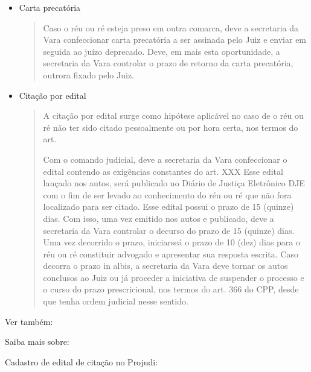 \documentclass[letterpaper,10pt,brazil]{sphinxmanual}
\begin{document}
\begin{itemize}
\begin{quote}
\begin{itemize}
\end{itemize}
\end{quote}

\item {} 
\sphinxAtStartPar
Carta precatória
\begin{quote}

\sphinxAtStartPar
Caso o réu ou ré esteja preso em outra comarca, deve a secretaria da Vara confeccionar carta precatória a ser assinada pelo Juiz e enviar em seguida ao juízo deprecado. Deve, em mais esta oportunidade, a secretaria da Vara controlar o prazo de retorno da carta precatória, outrora fixado pelo Juiz.
\end{quote}

\item {} 
\sphinxAtStartPar
Citação por edital
\begin{quote}

\sphinxAtStartPar
A citação por edital surge como hipótese aplicável no caso de o réu ou ré não ter sido citado pessoalmente ou por hora certa, nos termos do art.

\sphinxAtStartPar
Com o comando judicial, deve a secretaria da Vara confeccionar o edital contendo as exigências constantes do art. XXX
Esse edital lançado nos autos, será publicado no Diário de Justiça Eletrônico \sphinxhyphen{} DJE com o fim de ser levado ao conhecimento do réu ou ré que não fora localizado para ser citado.
Esse edital possui o prazo de 15 (quinze) dias. Com isso, uma vez emitido nos autos e publicado, deve a secretaria da Vara controlar o decurso do prazo de 15 (quinze) dias. Uma vez decorrido o prazo, iniciar\sphinxhyphen{}se\sphinxhyphen{}á o prazo de 10 (dez) dias para o réu ou ré constituir advogado e apresentar sua resposta escrita. Caso decorra o prazo in albis, a secretaria da Vara deve tornar os autos conclusos ao Juiz ou já proceder a iniciativa de suspender o processo e o curso do prazo prescricional, nos termos do art. 366 do CPP, desde que tenha ordem judicial nesse sentido.
\end{quote}

\end{itemize}


\begin{sphinxseealso}{Ver também:}

\sphinxAtStartPar
Saiba mais sobre:

\sphinxAtStartPar
Cadastro de edital de citação no Projudi: {\hyperref[\detokenize{projud_33_ordenarcumprimento::doc}]{}}


\end{sphinxseealso}
\end{document}
